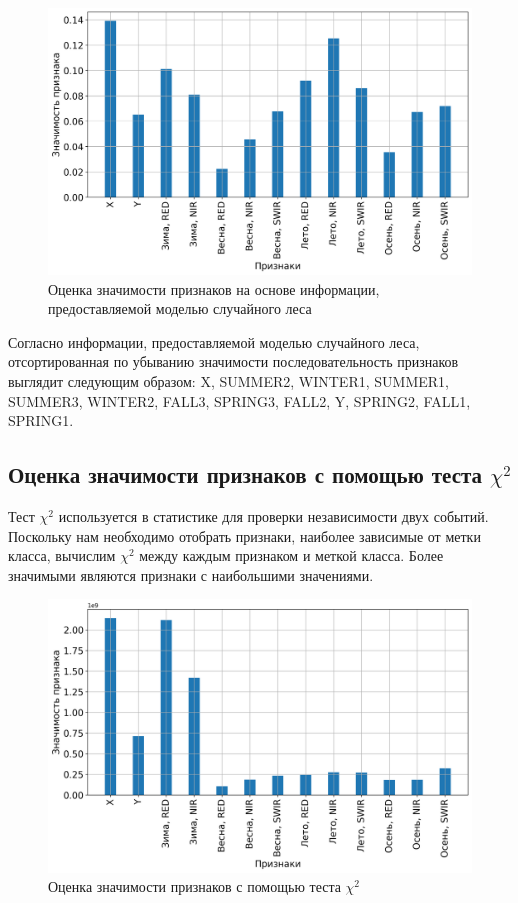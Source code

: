 \documentclass[14pt, a4paper, oneside]{extarticle}
\begin{document}
\begin{figure}[H]
    \caption{Оценка значимости признаков на основе информации, предоставляемой моделью случайного леса}
    \centering
    \includegraphics[scale=0.6]{rf-feature-importances}
\end{figure}

Согласно информации, предоставляемой моделью случайного леса, отсортированная по убыванию значимости последовательность признаков выглядит следующим образом: X, SUMMER2, WINTER1, SUMMER1, SUMMER3, WINTER2, FALL3, SPRING3, FALL2, Y, SPRING2, FALL1, SPRING1.

\subsection{Оценка значимости признаков с помощью теста $\chi^2$}
Тест $\chi^2$ используется в статистике для проверки независимости двух событий. Поскольку нам необходимо отобрать признаки, наиболее зависимые от метки класса, вычислим $\chi^2$ между каждым признаком и меткой класса. Более значимыми являются признаки с наибольшими значениями.

\begin{figure}[H]
    \caption{Оценка значимости признаков с помощью теста $\chi^2$}
    \centering
    \includegraphics[scale=0.6]{k-best-selector-feature-scores}
\end{figure}
\end{document}
